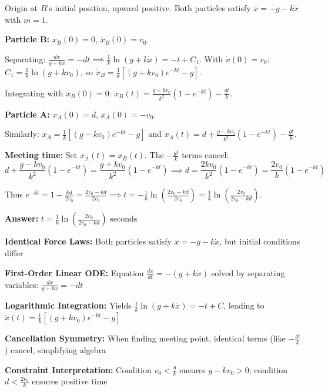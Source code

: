 \begin{solution}
Origin at $B$'s initial position, upward positive. Both particles satisfy $\ddot{x} = -g - k\dot{x}$ with $m=1$.

\textbf{Particle B:} $x_B(0)=0$, $\dot{x}_B(0)=v_0$. 

Separating: $\frac{d\dot{x}}{g+k\dot{x}} = -dt \implies \frac{1}{k}\ln(g+k\dot{x}) = -t + C_1$. With $\dot{x}(0)=v_0$: $C_1 = \frac{1}{k}\ln(g+kv_0)$, so $\dot{x}_B = \frac{1}{k}[(g+kv_0)e^{-kt} - g]$.

Integrating with $x_B(0)=0$: $x_B(t) = \frac{g+kv_0}{k^2}(1-e^{-kt}) - \frac{gt}{k}$.

\textbf{Particle A:} $x_A(0)=d$, $\dot{x}_A(0)=-v_0$. 

Similarly: $\dot{x}_A = \frac{1}{k}[(g-kv_0)e^{-kt} - g]$ and $x_A(t) = d + \frac{g-kv_0}{k^2}(1-e^{-kt}) - \frac{gt}{k}$.

\textbf{Meeting time:} Set $x_A(t) = x_B(t)$. The $-\frac{gt}{k}$ terms cancel:
\[
d + \frac{g-kv_0}{k^2}(1-e^{-kt}) = \frac{g+kv_0}{k^2}(1-e^{-kt}) \implies d = \frac{2kv_0}{k^2}(1-e^{-kt}) = \frac{2v_0}{k}(1-e^{-kt})
\]

Thus $e^{-kt} = 1 - \frac{kd}{2v_0} = \frac{2v_0-kd}{2v_0} \implies t = -\frac{1}{k}\ln\left(\frac{2v_0-kd}{2v_0}\right) = \frac{1}{k}\ln\left(\frac{2v_0}{2v_0-kd}\right)$.

\textbf{Answer:} $\boxed{t = \frac{1}{k}\ln\left(\frac{2v_0}{2v_0-kd}\right) \text{ seconds}}$
\end{solution}

\begin{takeaways}
\item \textbf{Identical Force Laws:} Both particles satisfy $\ddot{x} = -g - k\dot{x}$, but initial conditions differ
\item \textbf{First-Order Linear ODE:} Equation $\frac{d\dot{x}}{dt} = -(g+k\dot{x})$ solved by separating variables: $\frac{d\dot{x}}{g+k\dot{x}} = -dt$
\item \textbf{Logarithmic Integration:} Yields $\frac{1}{k}\ln(g+k\dot{x}) = -t + C$, leading to $\dot{x}(t) = \frac{1}{k}[(g+kv_0)e^{-kt} - g]$
\item \textbf{Cancellation Symmetry:} When finding meeting point, identical terms (like $-\frac{gt}{k}$) cancel, simplifying algebra
\item \textbf{Constraint Interpretation:} Condition $v_0 < \frac{g}{k}$ ensures $g-kv_0 > 0$; condition $d < \frac{2v_0}{k}$ ensures positive time
\end{takeaways}

